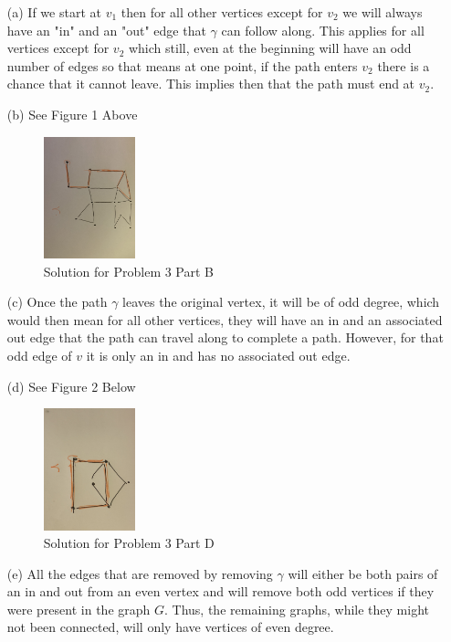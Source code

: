 \documentclass[11pt]{article}
\theoremstyle{definition}
\begin{document}
\begin{enumerate}
        \item [(a)] If we start at $v_1$ then for all other vertices except for $v_2$ we will always have an "in" and an "out" edge that $\gamma$ can follow along. This applies for all vertices except for $v_2$ which still, even at the beginning will have an odd number of edges so that means at one point, if the path enters $v_2$ there is a chance that it cannot leave. This implies then that the path must end at $v_2.$
        \item [(b)] See Figure 1 Above
        \begin{figure}
            \centering
            \includegraphics[width=0.25\textwidth]{IMG_4125.jpg}
            \caption{Solution for Problem 3 Part B}
        \end{figure}
        \item [(c)] Once the path $\gamma$ leaves the original vertex, it will be of odd degree, which would then mean for all other vertices, they will have an in and an associated out edge that the path can travel along to complete a path. However, for that odd edge of $v$ it is only an in and has no associated out edge.
        \item [(d)] See Figure 2 Below
        \begin{figure}
            \centering
            \includegraphics[width=0.25\textwidth]{IMG_4126.jpg}
            \caption{Solution for Problem 3 Part D}
        \end{figure}
        \item [(e)] All the edges that are removed by removing $\gamma$ will either be both pairs of an in and out from an even vertex and will remove both odd vertices if they were present in the graph $G$. Thus, the remaining graphs, while they might not been connected, will only have vertices of even degree.

\end{enumerate}
\end{document}
